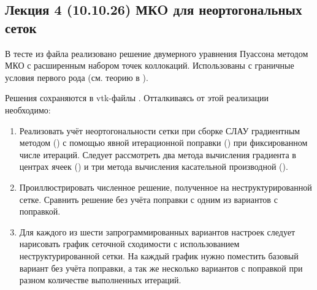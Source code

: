 \subsection{Лекция 4 (10.10.26) МКO для неортогональных сеток}
В тесте  из файла 
реализовано решение двумерного уравнения Пуассона методом МКО с расширенным набором точек коллокаций.
Использованы с граничные условия первого рода (см. теорию в ).

Решения сохраняются в vtk-файлы .
Отталкиваясь от этой реализации необходимо:

\begin{enumerate}
\item Реализовать учёт неортогональности сетки при сборке СЛАУ градиентным методом ()
      с помощью явной итерационной поправки ()
      при фиксированном числе итераций.
      Следует рассмотреть два метода вычисления градиента в центрах ячеек ()
      и три метода вычисления касательной производной ().
\item Проиллюстрировать численное решение, полученное на неструктурированной сетке.
      Сравнить решение без учёта поправки с одним из вариантов с поправкой.
\item Для каждого из шести запрограммированных вариантов настроек
      следует нарисовать график сеточной сходимости с использованием неструктурированной сетки.
      На каждый график нужно поместить базовый вариант без учёта поправки,
      а так же несколько вариантов с поправкой при разном количестве выполненных итераций.
\end{enumerate}

